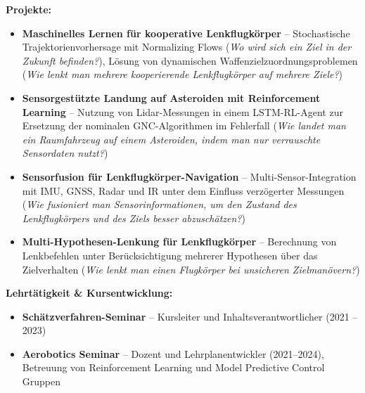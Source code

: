 \documentclass[11pt,a4paper]{article}
\begin{document}

\vspace{2pt}


\hspace{-0.0em}\textbf{Projekte:}

\begin{itemize}[leftmargin=1.0cm]
    \item \textbf{Maschinelles Lernen für kooperative Lenkflugkörper} -- Stochastische Trajektorienvorhersage mit Normalizing Flows (\textit{Wo wird sich ein Ziel in der Zukunft befinden?}), Lösung von dynamischen Waffenzielzuordnungsproblemen (\textit{Wie lenkt man mehrere kooperierende Lenkflugkörper auf mehrere Ziele?})

    \item \textbf{Sensorgestützte Landung auf Asteroiden mit Reinforcement Learning} -- Nutzung von Lidar-Messungen in einem LSTM-RL-Agent zur Ersetzung der nominalen GNC-Algorithmen im Fehlerfall (\textit{Wie landet man ein Raumfahrzeug auf einem Asteroiden, indem man nur verrauschte Sensordaten nutzt?})

    \item \textbf{Sensorfusion für Lenkflugkörper-Navigation} -- Multi-Sensor-Integration mit IMU, GNSS, Radar und IR unter dem Einfluss verzögerter Messungen (\textit{Wie fusioniert man Sensorinformationen, um den Zustand des Lenkflugkörpers und des Ziels besser abzuschätzen?})

    \item \textbf{Multi-Hypothesen-Lenkung für Lenkflugkörper} -- Berechnung von Lenkbefehlen unter Berücksichtigung mehrerer Hypothesen über das Zielverhalten (\textit{Wie lenkt man einen Flugkörper bei unsicheren Zielmanövern?})
\end{itemize}

\hspace{0.0em}\textbf{Lehrtätigkeit \& Kursentwicklung:}
\begin{itemize}[leftmargin=1.0cm]
    \item \textbf{Schätzverfahren-Seminar} -- Kursleiter und Inhaltsverantwortlicher (2021 -- 2023)
    \item \textbf{Aerobotics Seminar} -- Dozent und Lehrplanentwickler (2021--2024), Betreuung von Reinforcement Learning und Model Predictive Control Gruppen
\end{itemize}

\vspace{2pt}
\end{document}
